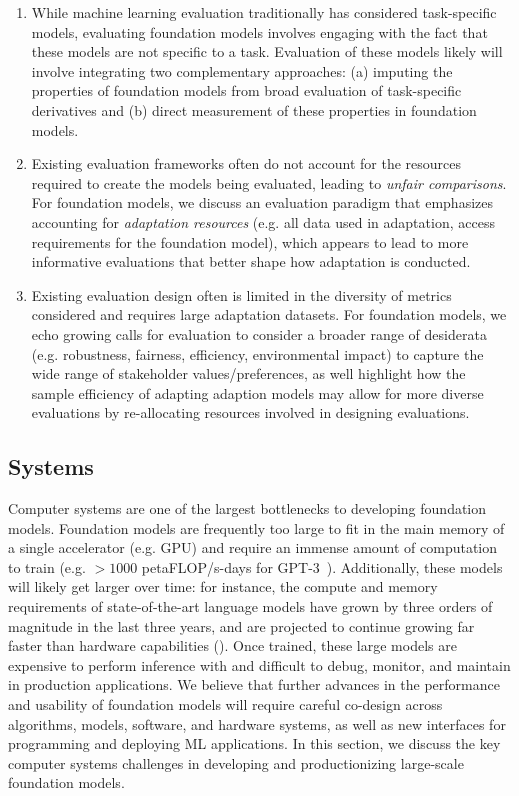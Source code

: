 \begin{enumerate}
    \item While machine learning evaluation traditionally has considered task-specific models, evaluating foundation models involves engaging with the fact that these models are not specific to a task. Evaluation of these models likely will involve integrating two complementary approaches: (a) imputing the properties of foundation models from broad evaluation of task-specific derivatives and (b) direct measurement of these properties in foundation models.  
    \item
    Existing evaluation frameworks often do not account for the resources required to create the models being evaluated, leading to \textit{unfair comparisons}. For foundation models, we discuss an evaluation paradigm that emphasizes accounting for \textit{adaptation resources} (e.g. all data used in adaptation, access requirements for the foundation model), which appears to lead to more informative evaluations that better shape how adaptation is conducted.
    \item 
    Existing evaluation design often is limited in the diversity of metrics considered and requires large adaptation datasets. For foundation models, we echo growing calls for evaluation to consider a broader range of desiderata (e.g. robustness, fairness, efficiency, environmental impact) to capture the wide range of stakeholder values/preferences, as well highlight how the sample efficiency of adapting adaption models may allow for more diverse evaluations by re-allocating resources involved in designing evaluations.
\end{enumerate}

\newsection
\subsection{Systems}
\label{sec:systems}

Computer systems are one of the largest bottlenecks to developing foundation models. Foundation models are frequently too large to fit in the main memory of a single accelerator (e.g. GPU) and require an immense amount of computation to train (e.g. $>1000$ petaFLOP/s-days for GPT-3~\citep{brown2020gpt3}). Additionally, these models will likely get larger over time: for instance, the compute and memory requirements of state-of-the-art language models have grown by three orders of magnitude in the last three years, and are projected to continue growing far faster than hardware capabilities (). Once trained, these large models are expensive to perform inference with and difficult to debug, monitor, and maintain in production applications. We believe that further advances in the performance and usability of foundation models will require careful co-design across algorithms, models, software, and hardware systems, as well as new interfaces for programming and deploying ML applications. In this section, we discuss the key computer systems challenges in developing and productionizing large-scale foundation models.

